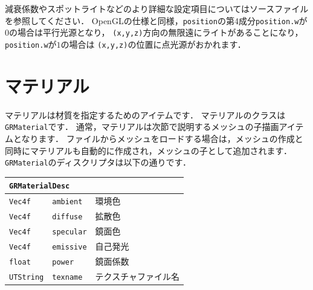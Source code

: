 \KLUDGE 減衰係数やスポットライトなどのより詳細な設定項目についてはソースファイルを参照してください．
OpenGLの仕様と同様，\texttt{position}の第4成分\texttt{position.w}が$0$の場合は平行光源となり，
\texttt{(x,y,z)}方向の無限遠にライトがあることになり，\texttt{position.w}が$1$の場合は
\texttt{(x,y,z)}の位置に点光源がおかれます．

\section{マテリアル}
\label{sec_grmaterial}

\KLUDGE マテリアルは材質を指定するためのアイテムです．
\KLUDGE マテリアルのクラスは\texttt{GRMaterial}です．
\KLUDGE 通常，マテリアルは次節で説明するメッシュの子描画アイテムとなります．
\KLUDGE ファイルからメッシュをロードする場合は，メッシュの作成と同時にマテリアルも自動的に作成され，メッシュの子として追加されます．
\texttt{GRMaterial}のディスクリプタは以下の通りです．

\begin{center}
\begin{tabular}{p{.15\hsize}p{.45\hsize}p{.3\hsize}}
\multicolumn{3}{l}{\texttt{GRMaterialDesc}}				\\ \midrule
\texttt{Vec4f}		&	\texttt{ambient}	& 環境色 	\\
\texttt{Vec4f}		&	\texttt{diffuse}	& 拡散色 	\\
\texttt{Vec4f}		&	\texttt{specular}	& 鏡面色	\\
\texttt{Vec4f}		&	\texttt{emissive}	& 自己発光	\\
\texttt{float}		&	\texttt{power}		& 鏡面係数	\\
\texttt{UTString}	&	\texttt{texname}	& テクスチャファイル名
\end{tabular}
\end{center}

